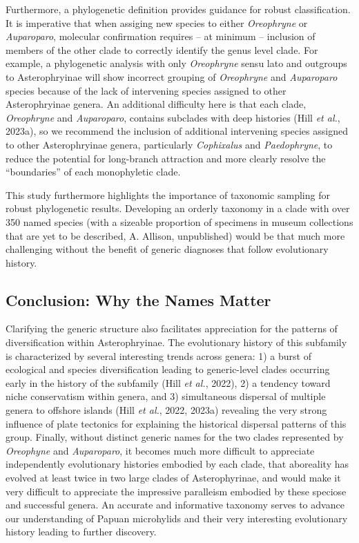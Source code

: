 \documentclass[
  letterpaper,
  DIV=11,
  numbers=noendperiod]{scrartcl}
\begin{document}
Furthermore, a phylogenetic definition provides guidance for robust
classification. It is imperative that when assiging new species to
either \emph{Oreophryne} or \emph{Auparoparo}, molecular confirmation
requires -- at minimum -- inclusion of members of the other clade to
correctly identify the genus level clade. For example, a phylogenetic
analysis with only \emph{Oreophryne} sensu lato and outgroups to
Asterophryinae will show incorrect grouping of \emph{Oreophryne} and
\emph{Auparoparo} species because of the lack of intervening species
assigned to other Asterophryinae genera. An additional difficulty here
is that each clade, \emph{Oreophryne} and \emph{Auparoparo}, contains
subclades with deep histories (Hill \emph{et al.}, 2023a), so we
recommend the inclusion of additional intervening species assigned to
other Asterophryinae genera, particularly \emph{Cophixalus} and
\emph{Paedophryne}, to reduce the potential for long-branch attraction
and more clearly resolve the ``boundaries'' of each monophyletic clade.

This study furthermore highlights the importance of taxonomic sampling
for robust phylogenetic results. Developing an orderly taxonomy in a
clade with over 350 named species (with a sizeable proportion of
specimens in museum collections that are yet to be described, A.
Allison, unpublished) would be that much more challenging without the
benefit of generic diagnoses that follow evolutionary history.

\subsection{Conclusion: Why the Names
Matter}\label{conclusion-why-the-names-matter}

Clarifying the generic structure also facilitates appreciation for the
patterns of diversification within Asterophryinae. The evolutionary
history of this subfamily is characterized by several interesting trends
across genera: 1) a burst of ecological and species diversification
leading to generic-level clades occurring early in the history of the
subfamily (Hill \emph{et al.}, 2022), 2) a tendency toward niche
conservatism within genera, and 3) simultaneous dispersal of multiple
genera to offshore islands (Hill \emph{et al.}, 2022, 2023a) revealing
the very strong influence of plate tectonics for explaining the
historical dispersal patterns of this group. Finally, without distinct
generic names for the two clades represented by \emph{Oreophyne} and
\emph{Auparoparo}, it becomes much more difficult to appreciate
independently evolutionary histories embodied by each clade, that
aboreality has evolved at least twice in two large clades of
Asterophyrinae, and would make it very difficult to appreciate the
impressive paralleism embodied by these speciose and successful genera.
An accurate and informative taxonomy serves to advance our understanding
of Papuan microhylids and their very interesting evolutionary history
leading to further discovery.
\end{document}
